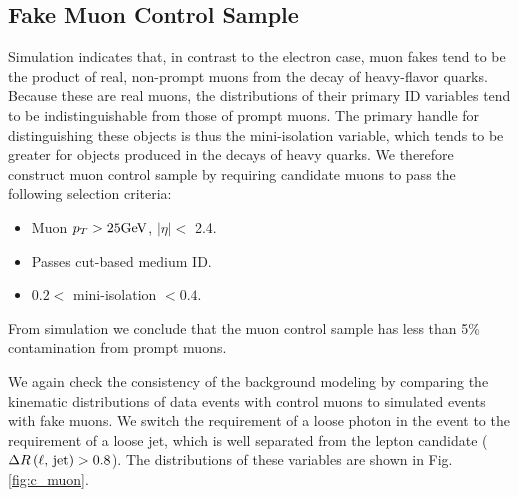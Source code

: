 \documentclass[thesis.tex]{subfiles}
\renewcommand\_{\textunderscore\allowbreak}
\begin{document}
\subsection{Fake Muon Control Sample}

Simulation indicates that, in contrast to the electron case, muon fakes tend to
be the product of real, non-prompt muons from the decay of heavy-flavor quarks.
Because these are real muons, the distributions of their primary ID variables
tend to be indistinguishable from those of prompt muons. The primary handle for
distinguishing these objects is thus the mini-isolation variable, which tends
to be greater for objects produced in the decays of heavy quarks. We therefore
construct muon control sample by requiring candidate muons to pass the following
selection criteria:
\begin{itemize}
    \item Muon $p_T > 25\text{GeV}$, $|\eta| <$ 2.4.
    \item Passes cut-based medium ID.
    \item $0.2 <$ mini-isolation $< 0.4$.
\end{itemize}
From simulation we conclude that the muon control sample has less than 5\%
contamination from prompt muons.

We again check the consistency of the background modeling by comparing the
kinematic distributions of data events with control muons to simulated events
with fake muons. We switch the requirement of a loose photon in the event
to the requirement of a loose jet, which is well separated from the lepton candidate
($\Delta R\left(\textrm{\ensuremath{\ell}, jet}\right) > 0.8$). The distributions of these
variables are shown in Fig. \ref{fig:c_muon}. 
\end{document}
